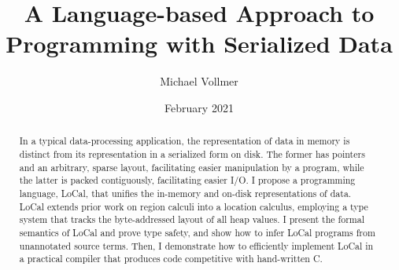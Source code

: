 \documentclass[showabstract,showacknowledgments,showpreface,showdedication,school]{iuphd}
\title{A Language-based Approach to Programming with Serialized Data}
\author{Michael Vollmer}
\date{February 2021} %
\theoremstyle{nonumberplain}
\begin{document}
\maketitle
\acceptancepage










\begin{abstract}

In a typical data-processing application, the representation of data in memory is distinct from its representation in a serialized form on disk. The former has pointers and an arbitrary, sparse layout, facilitating easier manipulation by a program, while the latter is packed contiguously, facilitating easier I/O. I propose a programming language, LoCal, that unifies the in-memory and on-disk representations of data. LoCal extends prior work on region calculi into a location calculus, employing a type system that tracks the byte-addressed layout of all heap values.
%
I present the formal semantics of LoCal and prove type safety, and show how to infer LoCal programs from unannotated source terms. Then, I demonstrate how to efficiently implement LoCal in a practical compiler that produces code competitive with hand-written C.
\linebreak\vspace{1em}

\end{abstract}
\end{document}
